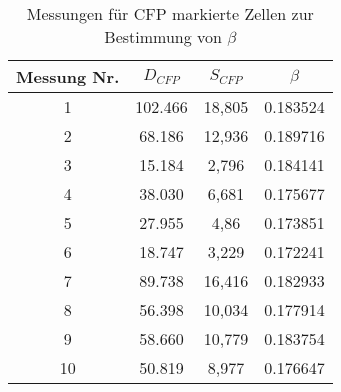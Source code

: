 \begin{table}[h]
    \centering
    \begin{tabular}{c|c|c|c}
         Messung Nr. &        $D_{CFP}$ &           $S_{CFP}$ &      $\beta$ \\ \hline\hline
               1 &  102.466 &      18,805 &  0.183524 \\\hline
               2 &   68.186 &      12,936 &  0.189716 \\\hline
               3 &   15.184 &       2,796 &  0.184141 \\\hline
               4 &   38.030 &       6,681 &  0.175677 \\\hline
               5 &   27.955 &        4,86 &  0.173851 \\\hline
               6 &   18.747 &       3,229 &  0.172241 \\\hline
               7 &   89.738 &      16,416 &  0.182933 \\\hline
               8 &   56.398 &      10,034 &  0.177914 \\\hline
               9 &   58.660 &      10,779 &  0.183754 \\\hline
              10 &   50.819 &       8,977 &  0.176647 \\\hline
        \end{tabular}
    \caption{Messungen für CFP markierte Zellen zur Bestimmung von $\beta$}
\end{table}

